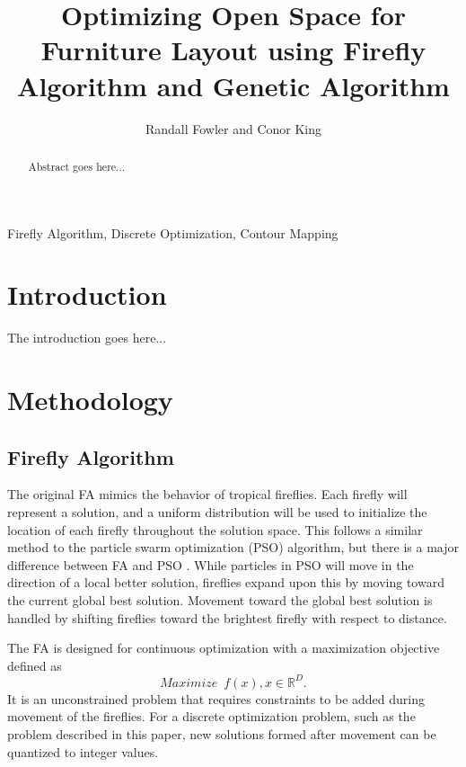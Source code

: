 \documentclass[conference]{IEEEtran}
\begin{document}
\graphicspath{{figures/}} %

\title{Optimizing Open Space for Furniture Layout using Firefly Algorithm and Genetic Algorithm}

\author{
    Randall Fowler and Conor King
}

\maketitle

\begin{abstract}
Abstract goes here...
\end{abstract}

\begin{IEEEkeywords}
Firefly Algorithm, Discrete Optimization, Contour Mapping
\end{IEEEkeywords}

\section{Introduction}
The introduction goes here...

\section{Methodology}
    \subsection{Firefly Algorithm}
    The original FA mimics the behavior of tropical fireflies. Each firefly will represent a solution, and a uniform distribution will be used to initialize the location of each firefly throughout the solution space. This follows a similar method to the particle swarm optimization (PSO) algorithm, but there is a major difference between FA and PSO \cite{swarmIntAlg}. While particles in PSO will move in the direction of a local better solution, fireflies expand upon this by moving toward the current global best solution. Movement toward the global best solution is handled by shifting fireflies toward the brightest firefly with respect to distance.

    The FA is designed for continuous optimization with a maximization objective defined as 
    \begin{equation}
    \label{OptObj}
        Maximize\;\: f(x), x \in \mathbb{R}^D.
    \end{equation}
    It is an unconstrained problem that requires constraints to be added during movement of the fireflies. For a discrete optimization problem, such as the problem described in this paper, new solutions formed after movement can be quantized to integer values.
\end{document}
